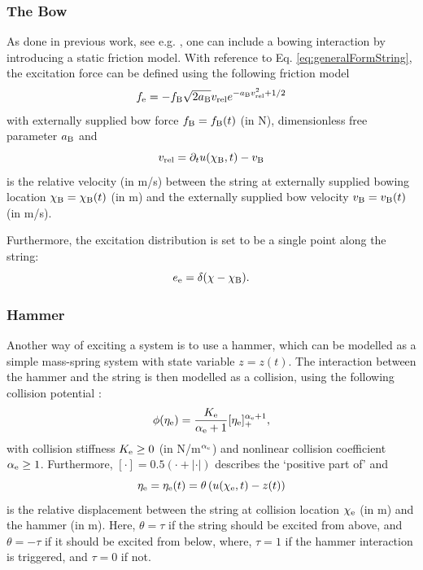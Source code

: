 \documentclass{article}
\begin{document}
\subsubsection{The Bow}
As done in previous work, see e.g. \cite{Willemsen2019}, one can include a bowing interaction by introducing a static friction model. With reference to Eq. \eqref{eq:generalFormString}, the excitation force can be defined using the following friction model \cite{theBible}
\begin{equation}\label{eq:bowForce}
    f_\text{e} = - f_{\text{B}}\sqrt{2a_{\text{B}}}v_\text{rel} e^{-a_{\text{B}}v_\text{rel}^2+1/2} 
\end{equation}
with externally supplied bow force $f_{\text{B}} = f_{\text{B}}(t)$ (in N), dimensionless free parameter $a_{\text{B}}$ and 
\begin{equation}
    v_\text{rel} = \partial_t u(\chi_{\text{B}}, t) - v_{\text{B}}
\end{equation}
is the relative velocity (in m/s) between the string at externally supplied bowing location $\chi_{\text{B}} = \chi_{\text{B}}(t)$ (in m) and the externally supplied bow velocity $v_{\text{B}} = v_{\text{B}}(t)$ (in m/s).

Furthermore, the excitation distribution is set to be a single point along the string:
\begin{equation}
    e_\text{e} = \delta(\chi - \chi_{\text{B}}).
\end{equation}

\subsubsection{Hammer}
Another way of exciting a system is to use a hammer, which can be modelled as a simple mass-spring system with state variable $z=z(t)$. The interaction between the hammer and the string is then modelled as a collision, using the following collision potential \cite{Hertz1881}:
\begin{equation}\label{eq:potential}
    \phi(\eta_{\text{e}}) = \frac{K_{\text{e}}}{\alpha_{\text{e}}+1}[\eta_{\text{e}}]_+^{\alpha_{\text{e}}+1},
\end{equation}
with collision stiffness $K_{\text{e}} \geq 0$ (in N/m$^{\alpha_{\text{e}}}$) and nonlinear collision coefficient $\alpha_{\text{e}} \geq 1$. Furthermore, $[\cdot] = 0.5 (\cdot + |\cdot|)$ describes the `positive part of' and
\begin{equation}
    \eta_{\text{e}} = \eta_{\text{e}}(t) = \theta\left(u(\chi_{\text{e}}, t) - z(t)\right)
\end{equation}
is the relative displacement between the string at collision location $\chi_{\text{e}}$ (in m) and the hammer (in m). Here, $\theta = \tau$ if the string should be excited from above, and $\theta = -\tau$ if it should be excited from below, where, $\tau = 1$ if the hammer interaction is triggered, and $\tau = 0$ if not.  
\end{document}

